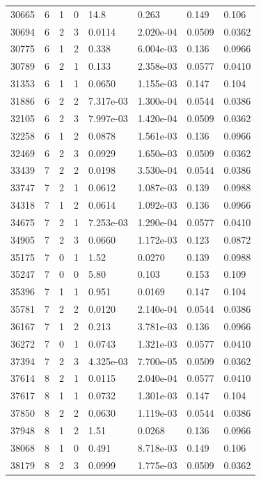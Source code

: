 \documentclass[preview]{standalone}
\begin{document}
{{{{\begin{tabular}{L{1.2cm}C{1.2cm} C{0.3cm}C{0.5cm} C{1.4cm}C{1.4cm} C{1.4cm}C{1.4cm}}
  30665  &     6  & 1     &  0 &  14.8  & 0.263  & 0.149 &  0.106   \\ 
  30694  &     6  & 2     &  3 &  0.0114  & 2.020e-04  & 0.0509 &  0.0362   \\ 
  30775  &     6  & 1     &  2 &  0.338  & 6.004e-03  & 0.136 &  0.0966   \\ 
  30789  &     6  & 2     &  1 &  0.133  & 2.358e-03  & 0.0577 &  0.0410   \\ 
  31353  &     6  & 1     &  1 &  0.0650  & 1.155e-03  & 0.147 &  0.104   \\ 
  31886  &     6  & 2     &  2 &  7.317e-03  & 1.300e-04  & 0.0544 &  0.0386   \\ 
  32105  &     6  & 2     &  3 &  7.997e-03  & 1.420e-04  & 0.0509 &  0.0362   \\ 
  32258  &     6  & 1     &  2 &  0.0878  & 1.561e-03  & 0.136 &  0.0966   \\ 
  32469  &     6  & 2     &  3 &  0.0929  & 1.650e-03  & 0.0509 &  0.0362   \\ 
  33439  &     7  & 2     &  2 &  0.0198  & 3.530e-04  & 0.0544 &  0.0386   \\ 
  33747  &     7  & 2     &  1 &  0.0612  & 1.087e-03  & 0.139 &  0.0988   \\ 
  34318  &     7  & 1     &  2 &  0.0614  & 1.092e-03  & 0.136 &  0.0966   \\ 
  34675  &     7  & 2     &  1 &  7.253e-03  & 1.290e-04  & 0.0577 &  0.0410   \\ 
  34905  &     7  & 2     &  3 &  0.0660  & 1.172e-03  & 0.123 &  0.0872   \\ 
  35175  &     7  & 0     &  1 &  1.52  & 0.0270  & 0.139 &  0.0988   \\ 
  35247  &     7  & 0     &  0 &  5.80  & 0.103  & 0.153 &  0.109   \\ 
  35396  &     7  & 1     &  1 &  0.951  & 0.0169  & 0.147 &  0.104   \\ 
  35781  &     7  & 2     &  2 &  0.0120  & 2.140e-04  & 0.0544 &  0.0386   \\ 
  36167  &     7  & 1     &  2 &  0.213  & 3.781e-03  & 0.136 &  0.0966   \\ 
  36272  &     7  & 0     &  1 &  0.0743  & 1.321e-03  & 0.0577 &  0.0410   \\ 
  37394  &     7  & 2     &  3 &  4.325e-03  & 7.700e-05  & 0.0509 &  0.0362   \\ 
  37614  &     8  & 2     &  1 &  0.0115  & 2.040e-04  & 0.0577 &  0.0410   \\ 
  37617  &     8  & 1     &  1 &  0.0732  & 1.301e-03  & 0.147 &  0.104   \\ 
  37850  &     8  & 2     &  2 &  0.0630  & 1.119e-03  & 0.0544 &  0.0386   \\ 
  37948  &     8  & 1     &  2 &  1.51  & 0.0268  & 0.136 &  0.0966   \\ 
  38068  &     8  & 1     &  0 &  0.491  & 8.718e-03  & 0.149 &  0.106   \\ 
  38179  &     8  & 2     &  3 &  0.0999  & 1.775e-03  & 0.0509 &  0.0362   \\ 
\hline 
\end{tabular} 

}}}}
\end{document}
